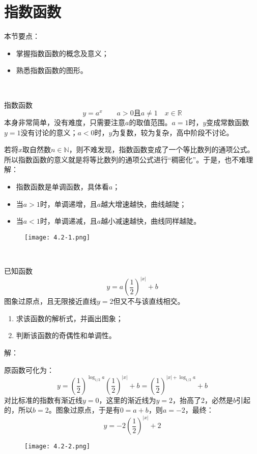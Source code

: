 \section{指数函数}

本节要点：
\begin{itemize}
    \item 掌握指数函数的概念及意义；
    \item 熟悉指数函数的图形。
\end{itemize}

~

指数函数
\[
y=a^x \qquad a>0\text{且}a\ne 1 \quad x\in \mathbb{R}
\]
本身非常简单，没有难度，只需要注意$a$的取值范围。$a=1$时，$y$变成常数函数$y=1$没有讨论的意义；$a<0$时，$y$为复数，较为复杂，高中阶段不讨论。

若将$x$取自然数$n\in \mathbb{N} $，则不难发现，指数函数变成了一个等比数列的通项公式。所以指数函数的意义就是将等比数列的通项公式进行“稠密化”。于是，也不难理解：
\begin{itemize}
    \item 指数函数是单调函数，具体看$a$；
    \item 当$a>1$时，单调递增，且$a$越大增速越快，曲线越陡；
    \item 当$a<1$时，单调递减，且$a$越小减速越快，曲线同样越陡。
\end{itemize}

\begin{figure}[h]
\centering
\texttt{[image: 4.2-1.png]}
\end{figure}

~

\begin{example}
已知函数
\[
y=a\left( \frac{1}{2} \right) ^{\left| x \right|}+b
\]
图象过原点，且无限接近直线$y=2$但又不与该直线相交。
\begin{enumerate}
    \item 求该函数的解析式，并画出图象；
    \item 判断该函数的奇偶性和单调性。
\end{enumerate}
\end{example}

解：

原函数可化为：
\[
y=\left( \frac{1}{2} \right) ^{\log _{1/2}a}\left( \frac{1}{2} \right) ^{\left| x \right|}+b=\left( \frac{1}{2} \right) ^{\left| x \right|+\log _{1/2}a}+b
\]
对比标准的指数有渐近线$y=0$，这里的渐近线为$y=2$，抬高了2，必然是$b$引起的，所以$b=2$。图象过原点，于是有$0=a+b$，则$a=-2$，最终：
\[
y=-2\left( \frac{1}{2} \right) ^{\left| x \right|}+2
\]
\begin{figure}[h]
\centering
\texttt{[image: 4.2-2.png]}
\end{figure}

